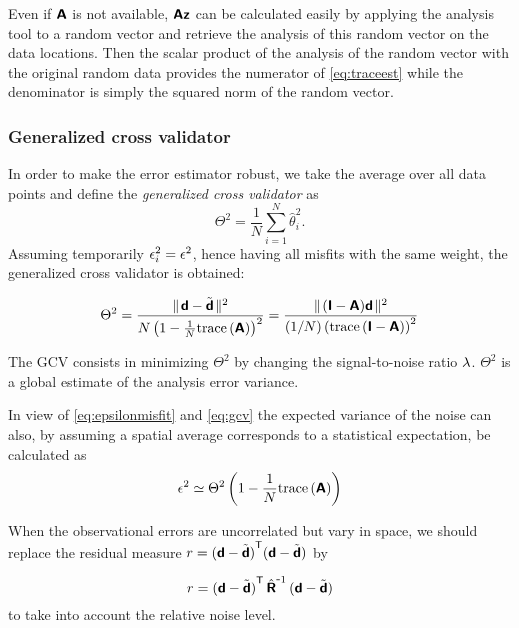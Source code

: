 Even if $\mbox{\boldmath $ \protect\mathsf{A} $}$ is not available, $\mbox{\boldmath $ \protect\mathsf{A} $} \mbox{\boldmath $ \protect\mathsf{z} $}$ can be calculated easily by applying the analysis tool to a random vector and retrieve the analysis of this random vector on the data locations. Then the scalar product of the analysis of the random vector with the original random data provides the numerator of \eqref{eq:traceest} while the denominator is simply the squared norm of the random vector.

\subsubsection{Generalized cross validator}

In order to make the error estimator robust, we take the average over all data points and define the \textit{generalized cross validator} as 
\[
\Theta^{2}=\frac{1}{N}\sum_{i=1}^{N}\hat{\theta}_i^2.
\] 
Assuming temporarily $\epsilon_{i}^{2} = \epsilon^{2}$, hence having all misfits with the same weight, the generalized cross validator is obtained:

\begin{equation}
\Theta^2=\frac{\parallel \! \mbox{\boldmath $ \protect\mathsf{d} $}-\tilde{\mbox{\boldmath $ \protect\mathsf{d} $}} \! \parallel^2}{N \left(1- \frac{1}{N}\mathrm{trace}\left( \mbox{\boldmath $ \protect\mathsf{A} $} \right)\right)^2} 
        =\frac{\parallel \! (\mbox{\boldmath $ \protect\mathsf{I} $}-\mbox{\boldmath $ \protect\mathsf{A} $})\mbox{\boldmath $ \protect\mathsf{d} $} \! \parallel^2}{(1/N)\left(\mathrm{trace}\left( \mbox{\boldmath $ \protect\mathsf{I} $}-\mbox{\boldmath $ \protect\mathsf{A} $} \right)\right)^2}
\label{eq:gcv}
\end{equation}

The GCV consists in minimizing $\Theta^{2}$ by changing the signal-to-noise ratio $\lambda$. $\Theta^2$ is a global estimate of the analysis error variance.

In view of \eqref{eq:epsilonmisfit} and \eqref{eq:gcv} the expected variance of the noise can also, by assuming a spatial average corresponds to a statistical expectation, be calculated as 
\begin{equation}
\epsilon^2 \simeq 
{\Theta^2  \left(1 - \frac{1}{N}\mathrm{trace}\left(  \mbox{\boldmath $ \protect\mathsf{A} $}  \right)\right) }
\label{eq:noiseestimate}
\end{equation}



When the observational errors are uncorrelated but vary in space, we should replace the residual measure $r = {(\mbox{\boldmath $ \protect\mathsf{d} $}-\tilde{\mbox{\boldmath $ \protect\mathsf{d} $}})}^\mathsf{T} (\mbox{\boldmath $ \protect\mathsf{d} $}-\tilde{\mbox{\boldmath $ \protect\mathsf{d} $}}) $ by 

\begin{equation}
r = {(\mbox{\boldmath $ \protect\mathsf{d} $}-\tilde{\mbox{\boldmath $ \protect\mathsf{d} $}})}^\mathsf{T} \,{ \hat{\mbox{\boldmath $ \protect\mathsf{R} $}}}^{ \mbox{\small{-}} 1} \,(\mbox{\boldmath $ \protect\mathsf{d} $}-\tilde{\mbox{\boldmath $ \protect\mathsf{d} $}})
\end{equation}
to take into account the relative noise level.


